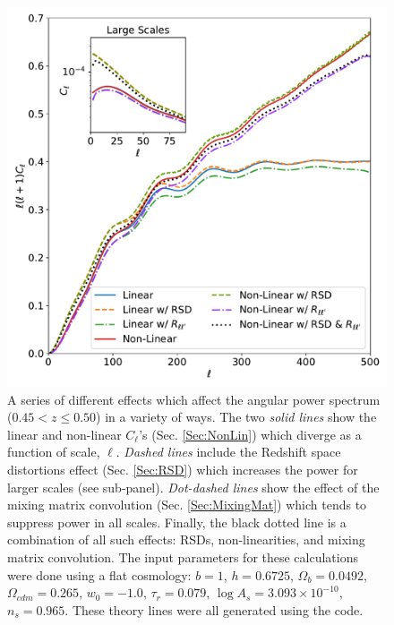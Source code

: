 \begin{figure}
\begin{center}
\includegraphics[width=\textwidth]{BOSS-FIGS/Cls-Comparison.pdf}
\caption[Different effects which affect the angular power spectrum modelled into \texttt{UCLCL}.]{A series of different effects which affect the angular power spectrum ($0.45 < z \leq 0.50$) in a variety of ways. The two \textit{solid lines} show the linear and non-linear $C_{\ell}$'s (Sec. \ref{Sec:NonLin}) which diverge as a function of scale, $\ell$. \textit{Dashed lines} include the Redshift space distortions effect (Sec. \ref{Sec:RSD}) which increases the power for larger scales (see sub-panel). \textit{Dot-dashed lines} show the effect of the mixing matrix convolution (Sec. \ref{Sec:MixingMat}) which tends to suppress power in all scales. Finally, the black dotted line is a combination of all such effects: RSDs, non-linearities, and mixing matrix convolution. The input parameters for these calculations were done using a flat cosmology: $b=1$, $h = 0.6725$, $\Omega_b = 0.0492$, $\Omega_{cdm} = 0.265$, $w_0=-1.0$, $\tau_r = 0.079$, $\log A_s = 3.093 \times 10^{-10}$, $n_s = 0.965$. These theory lines were all generated using the \uclcl code.}
\label{fig:Cl_Theory}
\end{center}
\end{figure}

